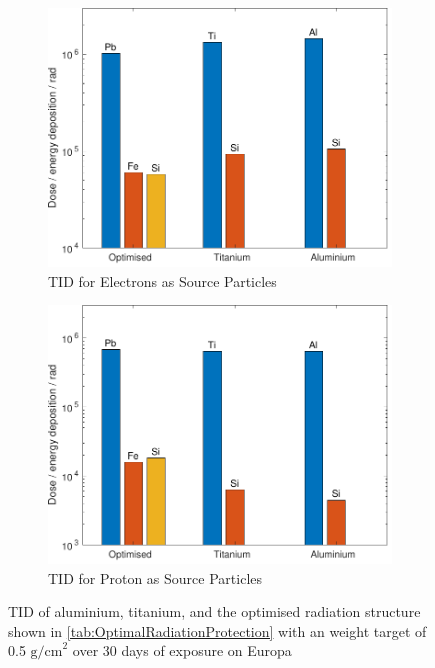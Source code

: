 \begin{figure}[htb]
     \centering
     \begin{subfigure}[b]{0.49\textwidth}
         \centering
         \includegraphics[width=\textwidth]{Media/J_Electron_Shielding}
         \caption{TID for Electrons as Source Particles}
         \label{fig:TIDElectronShielding}
     \end{subfigure}
     \hfill
     \begin{subfigure}[b]{0.49\textwidth}
         \centering
         \includegraphics[width=\textwidth]{Media/J_Proton_Shielding}
         \caption{TID for Proton as Source Particles}
         \label{fig:TIDProtonShielding}
     \end{subfigure}
     \caption{TID of aluminium, titanium, and the optimised radiation structure shown in \autoref{tab:OptimalRadiationProtection} with an weight target of 0.5 \(\text{g/cm}^2\) over 30 days of exposure on Europa}
     \label{fig:AluminiumTitanOptimised}
\end{figure}


